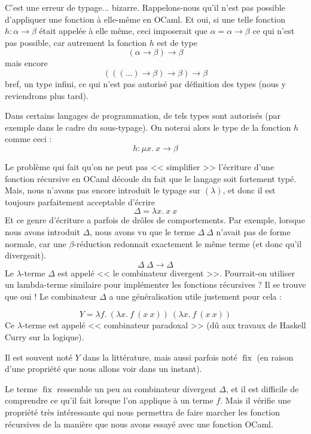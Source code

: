 \documentclass[11pt]{article}
\begin{document}
C'est une erreur de typage... bizarre. Rappelons-nous qu'il n'est pas possible d'appliquer une fonction à elle-même en OCaml. Et oui, si une telle fonction $h: \alpha \to \beta$ était appelée à elle même, ceci imposerait que $\alpha=\alpha\to\beta$ ce qui n'est pas possible, car autrement la fonction $h$ est de type
$$(\alpha \to \beta)\to\beta$$
mais encore
$$(((\dots) \to \beta) \to \beta)\to\beta$$
bref, un type infini, ce qui n'est pas autorisé par définition des types (nous y reviendrons plus tard).

\begin{remark}
    Dans certains langages de programmation, de tels types sont autorisés (par exemple dans le cadre du sous-typage). On noterai alors le type de la fonction $h$ comme ceci :
    $$h: \mu x.~x \to \beta$$
\end{remark}

Le problème qui fait qu'on ne peut pas << simplifier >> l'écriture d'une fonction récursive en OCaml découle du fait que le langage soit fortement typé. Mais, nous n'avons pas encore introduit le typage sur $(\lambda)$, et donc il est toujours parfaitement acceptable d'écrire 
$$\Delta = \lambda x.~x~x$$
Et ce genre d'écriture a parfois de drôles de comportements. Par exemple, lorsque nous avons introduit $\Delta$, nous avons vu que le terme $\Delta~\Delta$ n'avait pas de forme normale, car une $\beta$-réduction redonnait exactement le même terme (et donc qu'il divergeait).
$$\Delta~\Delta\longrightarrow\Delta$$
Le $\lambda$-terme $\Delta$ est appelé << le combinateur divergent >>. Pourrait-on utiliser un lambda-terme similaire pour implémenter les fonctions récursives ? Il se trouve que oui ! Le combinateur $\Delta$ a une généralisation utile justement pour cela :

\begin{definition}
    $$Y = \lambda f.~\left(\lambda x.~f~(x~x)\right)~\left(\lambda x.~f~(x~x)\right)$$
    Ce $\lambda$-terme est appelé << combinateur paradoxal >> (dû aux travaux de Haskell Curry sur la logique).
    
    Il est souvent noté $Y$ dans la littérature, mais aussi parfois noté $\operatorname{fix}$ (en raison d'une propriété que nous allons voir dans un instant).
\end{definition}

Le terme $\operatorname{fix}$ ressemble un peu au combinateur divergent $\Delta$, et il est difficile de comprendre ce qu'il fait lorsque l'on applique à un terme $f$. Mais il vérifie une propriété très intéressante qui nous permettra de faire marcher les fonction récursives de la manière que nous avons essayé avec une fonction OCaml.
\end{document}
